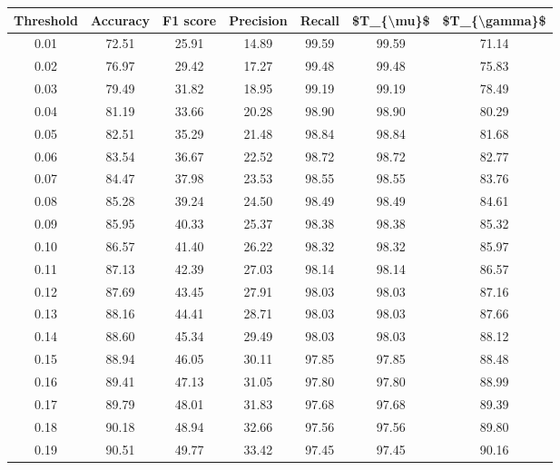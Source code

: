 \begin{tabular}{|c|c|c|c|c|c|c|}
\toprule
 Threshold &  Accuracy &  F1 score &  Precision &  Recall &  \$T\_\{\textbackslash mu\}\$ &  \$T\_\{\textbackslash gamma\}\$ \\
\hline
      0.01 &     72.51 &     25.91 &      14.89 &   99.59 &      99.59 &         71.14 \\
      0.02 &     76.97 &     29.42 &      17.27 &   99.48 &      99.48 &         75.83 \\
      0.03 &     79.49 &     31.82 &      18.95 &   99.19 &      99.19 &         78.49 \\
      0.04 &     81.19 &     33.66 &      20.28 &   98.90 &      98.90 &         80.29 \\
      0.05 &     82.51 &     35.29 &      21.48 &   98.84 &      98.84 &         81.68 \\
      0.06 &     83.54 &     36.67 &      22.52 &   98.72 &      98.72 &         82.77 \\
      0.07 &     84.47 &     37.98 &      23.53 &   98.55 &      98.55 &         83.76 \\
      0.08 &     85.28 &     39.24 &      24.50 &   98.49 &      98.49 &         84.61 \\
      0.09 &     85.95 &     40.33 &      25.37 &   98.38 &      98.38 &         85.32 \\
      0.10 &     86.57 &     41.40 &      26.22 &   98.32 &      98.32 &         85.97 \\
      0.11 &     87.13 &     42.39 &      27.03 &   98.14 &      98.14 &         86.57 \\
      0.12 &     87.69 &     43.45 &      27.91 &   98.03 &      98.03 &         87.16 \\
      0.13 &     88.16 &     44.41 &      28.71 &   98.03 &      98.03 &         87.66 \\
      0.14 &     88.60 &     45.34 &      29.49 &   98.03 &      98.03 &         88.12 \\
      0.15 &     88.94 &     46.05 &      30.11 &   97.85 &      97.85 &         88.48 \\
      0.16 &     89.41 &     47.13 &      31.05 &   97.80 &      97.80 &         88.99 \\
      0.17 &     89.79 &     48.01 &      31.83 &   97.68 &      97.68 &         89.39 \\
      0.18 &     90.18 &     48.94 &      32.66 &   97.56 &      97.56 &         89.80 \\
      0.19 &     90.51 &     49.77 &      33.42 &   97.45 &      97.45 &         90.16 \\

\end{tabular}

